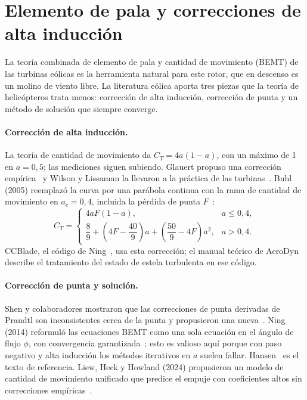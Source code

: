 \section{Elemento de pala y correcciones de alta inducción}\label{sec:literatura-bemt}
La teoría combinada de elemento de pala y cantidad de movimiento (BEMT) de las turbinas
eólicas es la herramienta natural para este rotor, que en descenso es un molino de
viento libre. La literatura eólica aporta tres piezas que la teoría de helicópteros trata
menos: corrección de alta inducción, corrección de punta y un método de solución que
siempre converge.

\paragraph{Corrección de alta inducción.} La teoría de cantidad de movimiento da
$C_T=4a(1-a)$, con un máximo de 1 en $a=0{,}5$; las mediciones siguen subiendo. Glauert
propuso una corrección empírica~\cite{literatura-glauert1926b} y Wilson y Lissaman la
llevaron a la práctica de las turbinas~\cite{literatura-wilson1974}. Buhl (2005)
reemplazó la curva por una parábola continua con la rama de cantidad de movimiento en
$a_c=0{,}4$, incluida la pérdida de punta $F$~\cite{literatura-buhl2005}:
\begin{equation}
  C_T=\begin{cases}
    4aF(1-a), & a\le0{,}4,\\[2pt]
    \dfrac89+\left(4F-\dfrac{40}{9}\right)a+\left(\dfrac{50}{9}-4F\right)a^2, & a>0{,}4.
  \end{cases}
  \label{eq:literatura-buhl}
\end{equation}
CCBlade, el código de Ning~\cite{literatura-ning2014}, usa esta corrección; el
manual teórico de AeroDyn~\cite{literatura-moriarty2005} describe el tratamiento del estado
de estela turbulenta en ese código.

\paragraph{Corrección de punta y solución.} Shen y colaboradores mostraron que las
correcciones de punta derivadas de Prandtl son inconsistentes cerca de la punta y
propusieron una nueva~\cite{literatura-shen2005}. Ning (2014) reformuló las ecuaciones
BEMT como una sola ecuación en el ángulo de flujo $\phi$, con convergencia
garantizada~\cite{literatura-ning2014}; esto es valioso aquí porque con paso negativo y
alta inducción los métodos iterativos en $a$ suelen fallar. Hansen~\cite{literatura-hansen2015}
es el texto de referencia. Liew, Heck y Howland (2024) propusieron un modelo de cantidad
de movimiento unificado que predice el empuje con coeficientes altos sin correcciones
empíricas~\cite{literatura-liew2024}.

